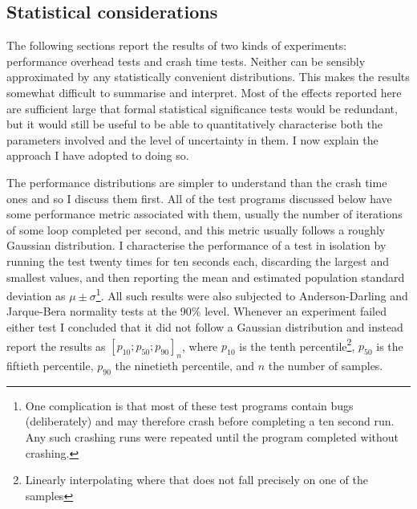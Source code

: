 \subsection{Statistical considerations}


The following sections report the results of two kinds of experiments:
performance overhead tests and crash time tests.  Neither can be
sensibly approximated by any statistically convenient distributions.
This makes the results somewhat difficult to summarise and interpret.
Most of the effects reported here are sufficient large that formal
statistical significance tests would be redundant, but it would still
be useful to be able to quantitatively characterise both the
parameters involved and the level of uncertainty in them.  I now
explain the approach I have adopted to doing so.

The performance distributions are simpler to understand than the crash
time ones and so I discuss them first.  All of the test programs
discussed below have some performance metric
associated with them, usually the number of iterations of some loop
completed per second, and this metric usually follows a roughly
Gaussian distribution.  I characterise the performance of a test in
isolation by running the test twenty times for ten seconds each,
discarding the largest and smallest values, and then reporting the
mean and estimated population standard deviation as $\mu \pm
\sigma$\footnote{One complication is that most of these test programs
  contain bugs (deliberately) and may therefore crash before
  completing a ten second run.  Any such crashing runs were repeated
  until the program completed without crashing.}.  All such results
were also subjected to Anderson-Darling and Jarque-Bera normality
tests at the 90\% level.  Whenever an experiment failed either test I
concluded that it did not follow a Gaussian distribution and instead
report the results as $[p_{10};p_{50};p_{90}]_n$, where $p_{10}$ is
the tenth percentile\footnote{Linearly interpolating where that does
  not fall precisely on one of the samples}, $p_{50}$ is the fiftieth
percentile, $p_{90}$ the ninetieth percentile, and $n$ the number of
samples.

